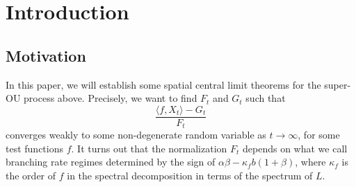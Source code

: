 \documentclass[12pt,a4paper]{amsart}
\theoremstyle{plain}
\theoremstyle{definition}
\numberwithin{equation}{section}
\begin{document}
\maketitle
\section{Introduction}
\subsection{Motivation}
\label{sec: Motivation}
In this paper, we will establish some spatial central limit theorems for the super-OU process above. Precisely, we want to find $F_t$ and $G_t$ such that
\[
    \frac{\langle f, X_t \rangle -G_t}{F_t}
\] 
    converges weakly to some non-degenerate random variable as $t\rightarrow\infty$, for some test functions $f$. 
    It turns out that the normalization $F_t$ depends on what we call branching rate regimes determined by the sign of $\alpha\beta-\kappa_f b (1+\beta)$, where $\kappa_f$ is the order of $f$ in the spectral decomposition in terms of the spectrum of $L$.
\end{document}
